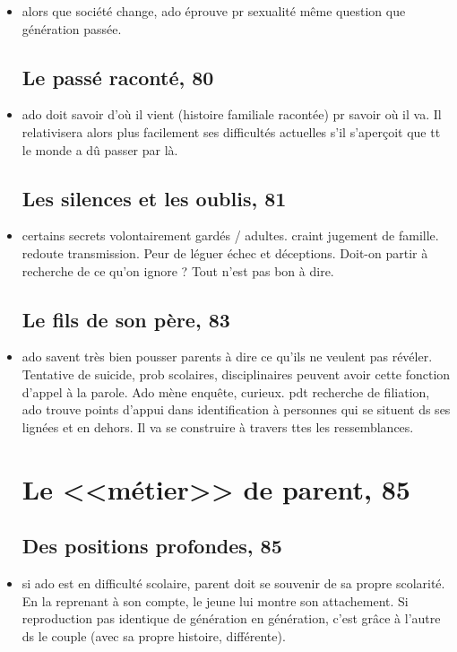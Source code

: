 \documentclass[12pt]{report}
\begin{document}
\begin{itemize}
\item alors que société change, ado éprouve pr sexualité même question que génération passée. 

\subsection{Le passé raconté, 80}

\item ado doit savoir d'où il vient (histoire familiale racontée) pr savoir où il va.  Il relativisera alors plus facilement ses difficultés actuelles s'il s'aperçoit que tt le monde a dû passer par là. 


\subsection{Les silences et les oublis, 81}

\item certains secrets volontairement gardés / adultes.  craint jugement de famille. redoute transmission. Peur de léguer échec et déceptions.  Doit-on partir à recherche de ce qu'on ignore ? Tout n'est pas bon à dire.

\subsection{Le fils de son père, 83}

\item ado savent très bien pousser parents à dire ce qu'ils ne veulent pas révéler. Tentative de suicide, prob scolaires, disciplinaires peuvent avoir cette fonction d'appel à la parole. Ado mène enquête, curieux. pdt recherche de filiation, ado trouve points d'appui dans identification à personnes qui se situent ds ses lignées et en dehors. Il va se construire à travers ttes les ressemblances. 

\section{Le <<métier>> de parent, 85}
\subsection{Des positions profondes, 85}

\item si ado est en difficulté scolaire, parent doit se souvenir de sa propre scolarité.  En la reprenant à son compte, le jeune lui montre son attachement. Si reproduction pas identique de génération en génération, c'est grâce à l'autre ds le couple (avec sa propre histoire, différente). 


\end{itemize}
\end{document}
